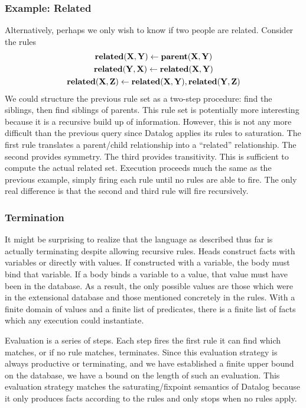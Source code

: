 \subsubsection{Example: Related}
Alternatively, perhaps we only wish to know if two people are related.
Consider the rules
\begin{gather*}
        {\bf related}({\bf X}, {\bf Y}) \leftarrow {\bf parent}({\bf X}, {\bf Y})\\
        {\bf related}({\bf Y}, {\bf X}) \leftarrow {\bf related}({\bf X}, {\bf Y})\\
        {\bf related}({\bf X}, {\bf Z}) \leftarrow {\bf related}({\bf X}, {\bf Y}), {\bf related}({\bf Y}, {\bf Z})
\end{gather*}
We could structure the previous rule set as a two-step procedure: find the siblings, then find siblings of parents.
This rule set is potentially more interesting because it is a recursive build up of information.
However, this is not any more difficult than the previous query since Datalog applies its rules to saturation.
The first rule translates a parent/child relationship into a ``related'' relationship.
The second provides symmetry.
The third provides transitivity.
This is sufficient to compute the actual related set.
Execution proceeds much the same as the previous example, simply firing each rule until no rules are able to fire.
The only real difference is that the second and third rule will fire recursively.
\subsubsection{Termination}
It might be surprising to realize that the language as described thus far is actually terminating despite allowing recursive rules.
Heads construct facts with variables or directly with values.
If constructed with a variable, the body must bind that variable.
If a body binds a variable to a value, that value must have been in the database.
As a result, the only possible values are those which were in the extensional database and those mentioned concretely in the rules.
With a finite domain of values and a finite list of predicates, there is a finite list of facts which any execution could instantiate.

Evaluation is a series of steps.
Each step fires the first rule it can find which matches, or if no rule matches, terminates.
Since this evaluation strategy is always productive or terminating, and we have established a finite upper bound on the database, we have a bound on the length of such an evaluation.
This evaluation strategy matches the saturating/fixpoint semantics of Datalog because it only produces facts according to the rules and only stops when no rules apply.

